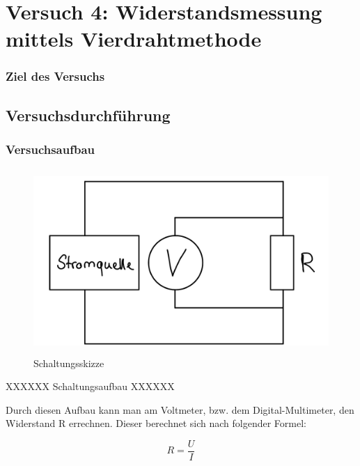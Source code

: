 \chapter{Versuch 4: Widerstandsmessung mittels Vierdrahtmethode}

\subsection{Ziel des Versuchs}

\section{Versuchsdurchführung}

\subsection{Versuchsaufbau}

\begin{figure}[H]
	\centering
	\includegraphics[height=7cm]{images/Versuch4/Schaltskizze.jpeg}
	\caption{Schaltungsskizze}
	\label{fig: Schaltungsskizze}
\end{figure}

XXXXXX Schaltungsaufbau XXXXXX

Durch diesen Aufbau kann man am Voltmeter, bzw. dem Digital-Multimeter,
den Widerstand R errechnen. Dieser berechnet sich nach folgender Formel:

\begin{equation}
    R = \frac{U}{I}
    \label{eq:R}
\end{equation}